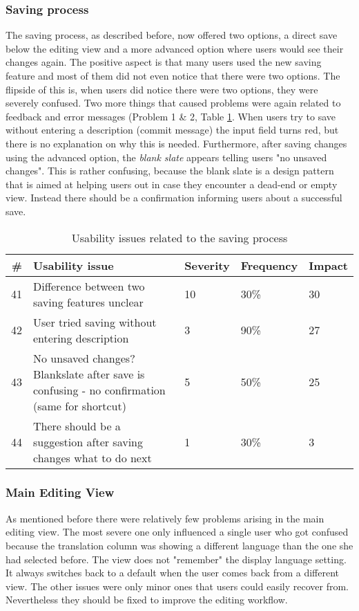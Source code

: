 \subsubsection{Saving process}
The saving process, as described before, now offered two options, a direct save below the editing view and a more advanced option where users would see their changes again. The positive aspect is that many users used the new saving feature and most of them did not even notice that there were two options. The flipside of this is, when users did notice there were two options, they were severely confused.
Two more things that caused problems were again related to feedback and error messages (Problem 1 \& 2, Table \ref{table:issues-saving}. When users try to save without entering a description (commit message) the input field turns red, but there is no explanation on why this is needed. Furthermore, after saving changes using the advanced option, the \textit{blank slate} \cite{_blank_????} appears telling users "no unsaved changes". This is rather confusing, because the blank slate is a design pattern that is aimed at helping users out in case they encounter a dead-end or empty view. Instead there should be a confirmation informing users about a successful save.

\begin{table}[h!]
\centering
\begin{tabular}{|r|p{7cm}|l|l|l|}
\hline
\rowcolor[HTML]{EFEFEF}
{\bf \#} & {\bf Usability issue} & {\bf Severity} & {\bf Frequency} & {\bf Impact} \\ \hline
41 & Difference between two saving features unclear & 10 & 30\% & 30 \\ \hline
42 & User tried saving without entering description & 3 & 90\% & 27 \\ \hline
43 & No unsaved changes? Blankslate after save is confusing - no confirmation (same for shortcut) & 5 & 50\% & 25 \\ \hline
44 & There should be a suggestion after saving changes what to do next & 1 & 30\% & 3 \\ \hline
\end{tabular}
\caption{Usability issues related to the saving process}
\label{table:issues-saving}
\end{table}

\subsubsection{Main Editing View}
As mentioned before there were relatively few problems arising in the main editing view. The most severe one only influenced a single user who got confused because the translation column was showing a different language than the one she had selected before. The view does not "remember" the display language setting. It always switches back to a default when the user comes back from a different view. The other issues were only minor ones that users could easily recover from. Nevertheless they should be fixed to improve the editing workflow.

